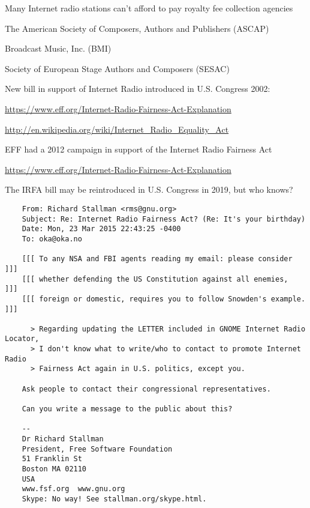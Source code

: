 \documentclass[20pt,landscape]{foils}
\begin{document}

\begin{list1}
\item Many Internet radio stations can't afford to pay royalty fee collection agencies
  \begin{list2}
  \item The American Society of Composers, Authors and Publishers (ASCAP)
  \item Broadcast Music, Inc. (BMI)
    \item Society of European Stage Authors and Composers (SESAC)
  \end{list2}
  \item New bill in support of Internet Radio introduced in U.S. Congress 2002:
  \begin{list2}
  \item \url{https://www.eff.org/Internet-Radio-Fairness-Act-Explanation}
  \item \url{http://en.wikipedia.org/wiki/Internet_Radio_Equality_Act}
  \end{list2}
\item EFF had a 2012 campaign in support of the Internet Radio Fairness Act
  \begin{list2}
  \item \url{https://www.eff.org/Internet-Radio-Fairness-Act-Explanation}
  \end{list2}
\item The IRFA bill may be reintroduced in U.S. Congress in 2019, but who knows?
\end{list1}


\begin{list1}
\item
  \begin{tiny}
\begin{verbatim}
    From: Richard Stallman <rms@gnu.org>
    Subject: Re: Internet Radio Fairness Act? (Re: It's your birthday)
    Date: Mon, 23 Mar 2015 22:43:25 -0400
    To: oka@oka.no

    [[[ To any NSA and FBI agents reading my email: please consider    ]]]
    [[[ whether defending the US Constitution against all enemies,     ]]]
    [[[ foreign or domestic, requires you to follow Snowden's example. ]]]

      > Regarding updating the LETTER included in GNOME Internet Radio Locator,
      > I don't know what to write/who to contact to promote Internet Radio
      > Fairness Act again in U.S. politics, except you.

    Ask people to contact their congressional representatives.

    Can you write a message to the public about this?

    -- 
    Dr Richard Stallman
    President, Free Software Foundation
    51 Franklin St
    Boston MA 02110
    USA
    www.fsf.org  www.gnu.org
    Skype: No way! See stallman.org/skype.html.
\end{verbatim}
  \end{tiny}
\end{list1}  
\end{document}
